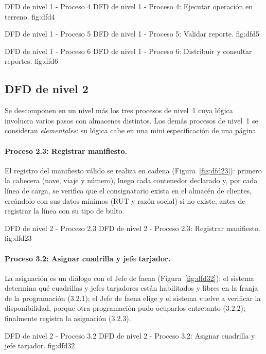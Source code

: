     {DFD de nivel 1 - Proceso 4}
    {DFD de nivel 1 - Proceso 4: Ejecutar operación en terreno.}
    {fig:dfd4}

    {DFD de nivel 1 - Proceso 5}
    {DFD de nivel 1 - Proceso 5: Validar reporte.}
    {fig:dfd5}

    {DFD de nivel 1 - Proceso 6}
    {DFD de nivel 1 - Proceso 6: Distribuir y consultar reportes.}
    {fig:dfd6}

\subsection{DFD de nivel 2}
\label{sec:dfd2}

Se descomponen en un nivel más los tres procesos de nivel~1 cuya lógica involucra varios
pasos con almacenes distintos. Los demás procesos de nivel~1 se consideran
\emph{elementales}: su lógica cabe en una mini especificación de una página.

\paragraph{Proceso 2.3: Registrar manifiesto.} El registro del manifiesto válido se realiza en
cadena (Figura~\ref{fig:dfd23}): primero la cabecera (nave, viaje y número), luego cada
contenedor declarado y, por cada línea de carga, se verifica que el consignatario exista en
el almacén de clientes, creándolo con sus datos mínimos (RUT y razón social) si no existe,
antes de registrar la línea con su tipo de bulto.

    {DFD de nivel 2 - Proceso 2.3}
    {DFD de nivel 2 - Proceso 2.3: Registrar manifiesto.}
    {fig:dfd23}

\paragraph{Proceso 3.2: Asignar cuadrilla y jefe tarjador.} La asignación es un diálogo con el
Jefe de faena (Figura~\ref{fig:dfd32}): el sistema determina qué cuadrillas y jefes tarjadores
están habilitados y libres en la franja de la programación (3.2.1); el Jefe de faena elige y
el sistema vuelve a verificar la disponibilidad, porque otra programación pudo ocuparlos
entretanto (3.2.2); finalmente registra la asignación (3.2.3).

    {DFD de nivel 2 - Proceso 3.2}
    {DFD de nivel 2 - Proceso 3.2: Asignar cuadrilla y jefe tarjador.}
    {fig:dfd32}

